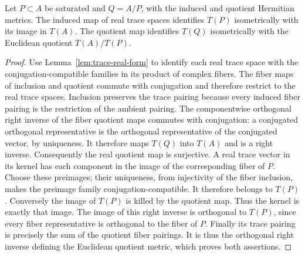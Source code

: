 \begin{lemma}
\label{lem:trace-quotient-metric}
\leanok
Let $P\subset A$ be saturated and $Q=A/P$, with the induced and quotient
Hermitian metrics. The induced map of real trace spaces identifies
$T(P)$ isometrically with its image in $T(A)$. The quotient map identifies
$T(Q)$ isometrically with the Euclidean quotient $T(A)/T(P)$.
\end{lemma}
\begin{proof}
Use Lemma~\ref{lem:trace-real-form} to identify each real trace space with
the conjugation-compatible families in its product of complex fibers.
The fiber maps of inclusion and quotient commute with conjugation and
therefore restrict to the real trace spaces. Inclusion preserves the
trace pairing because every induced fiber pairing is the restriction of
the ambient pairing. The componentwise orthogonal right inverse of the
fiber quotient maps commutes with conjugation: a conjugated orthogonal
representative is the orthogonal representative of the conjugated vector,
by uniqueness. It therefore maps $T(Q)$ into $T(A)$ and is a right inverse.
Consequently the real quotient map is surjective. A real trace vector in
its kernel has each component in the image of the corresponding fiber
of $P$. Choose these preimages; their uniqueness, from injectivity of the
fiber inclusion, makes the preimage family conjugation-compatible.
It therefore belongs to $T(P)$. Conversely the image of $T(P)$ is killed
by the quotient map. Thus the kernel is exactly that image.
The image of this right inverse is orthogonal to $T(P)$, since every
fiber representative is orthogonal to the fiber of $P$. Finally its
trace pairing is precisely the sum of the quotient fiber pairings.
It is thus the orthogonal right inverse defining the Euclidean quotient
metric, which proves both assertions.
\end{proof}

